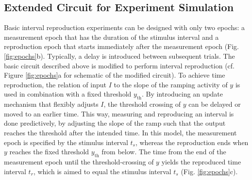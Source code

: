 \documentclass[10pt, a4paper]{article}
\begin{document}
\subsection{Extended Circuit for Experiment Simulation} %
Basic interval reproduction experiments can be designed with only two epochs: a measurement epoch that has the duration of the stimulus interval and a reproduction epoch that starts immediately after the measurement epoch (Fig. \ref{fig:epochs}b). Typically, a delay is introduced between subsequent trials. 
The basic circuit described above is modified to perform interval reproduction (cf. Figure \ref{fig:epochs}a for schematic of the modified circuit).
To achieve time reproduction, the relation of input $I$ to the slope of the ramping activity of $y$ is used in combination with a fixed threshold $y_{\text{th}}$.
By introducing an update mechanism that flexibly adjusts $I$, the threshold crossing of $y$ can be delayed or moved to an earlier time.
This way, measuring and reproducing an interval is done predictively, by adjusting the slope of the ramp such that the output reaches the threshold after the intended time.
In this model, the measurement epoch is specified by the stimulus interval $t_s$, whereas the reproduction ends when $y$ reaches the fixed threshold $y_{\text{th}}$ from below. 
The time from the end of the measurement epoch until the threshold-crossing of $y$ yields the reproduced time interval $t_r$, which is aimed to equal the stimulus interval $t_s$ (Fig. \ref{fig:epochs}c).
\end{document}
